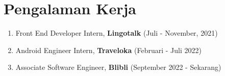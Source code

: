 \section*{Pengalaman Kerja}
\begin{enumerate}
    \itemsep0em 
    \item Front End Developer Intern, \textbf{Lingotalk} (Juli - November, 2021)
    \item Android Engineer Intern, \textbf{Traveloka} (Februari - Juli 2022)
    \item Associate Software Engineer, \textbf{Blibli} (September 2022 - Sekarang)
\end{enumerate}